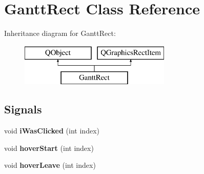 \hypertarget{class_gantt_rect}{}\section{Gantt\+Rect Class Reference}
\label{class_gantt_rect}
Inheritance diagram for Gantt\+Rect\+:\begin{figure}[H]
\begin{center}
\leavevmode
\includegraphics[height=2.000000cm]{class_gantt_rect}
\end{center}
\end{figure}
\subsection*{Signals}
\begin{DoxyCompactItemize}
\item 
\hypertarget{class_gantt_rect_a145e1920586490aa4d42d17c5f6c550c}{}void {\bfseries i\+Was\+Clicked} (int index)\label{class_gantt_rect_a145e1920586490aa4d42d17c5f6c550c}

\item 
\hypertarget{class_gantt_rect_af0d26710b0714d23877baf60448612ee}{}void {\bfseries hover\+Start} (int index)\label{class_gantt_rect_af0d26710b0714d23877baf60448612ee}

\item 
\hypertarget{class_gantt_rect_a7b68e31966743b4627919f14bcc3d33d}{}void {\bfseries hover\+Leave} (int index)\label{class_gantt_rect_a7b68e31966743b4627919f14bcc3d33d}

\end{DoxyCompactItemize}

